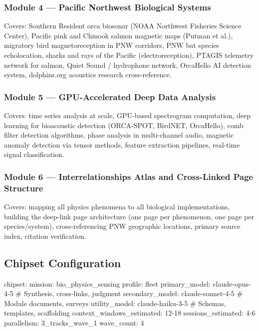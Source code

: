 \documentclass[11pt,letterpaper]{article}
\begin{document}
\subsubsection{Module 4 --- Pacific Northwest Biological Systems}
Covers: Southern Resident orca biosonar (NOAA Northwest Fisheries Science Center), Pacific pink and Chinook salmon magnetic maps (Putman et al.), migratory bird magnetoreception in PNW corridors, PNW bat species echolocation, sharks and rays of the Pacific (electroreception), PTAGIS telemetry network for salmon, Quiet Sound / hydrophone network, OrcaHello AI detection system, dolphins.org acoustics research cross-reference.

\subsubsection{Module 5 --- GPU-Accelerated Deep Data Analysis}
Covers: time series analysis at scale, GPU-based spectrogram computation, deep learning for bioacoustic detection (ORCA-SPOT, BirdNET, OrcaHello), comb filter detection algorithms, phase analysis in multi-channel audio, magnetic anomaly detection via tensor methods, feature extraction pipelines, real-time signal classification.

\subsubsection{Module 6 --- Interrelationships Atlas and Cross-Linked Page Structure}
Covers: mapping all physics phenomena to all biological implementations, building the deep-link page architecture (one page per phenomenon, one page per species/system), cross-referencing PNW geographic locations, primary source index, citation verification.

\subsection{Chipset Configuration}

\begin{asciibox}
chipset:
  mission: bio_physics_sensing
  profile: fleet
  primary_model: claude-opus-4-5          # Synthesis, cross-links, judgment
  secondary_model: claude-sonnet-4-5      # Module documents, surveys
  utility_model: claude-haiku-3-5         # Schemas, templates, scaffolding
  context_windows_estimated: 12-18
  sessions_estimated: 4-6
  parallelism: 3_tracks_wave_1
  wave_count: 4
\end{asciibox}
\end{document}
